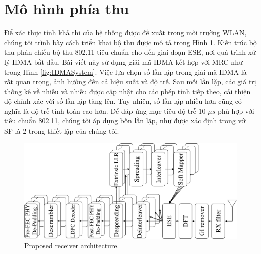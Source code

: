 \section{Mô hình phía thu}

Để xác thực tính khả thi của hệ thống được đề xuất trong môi trường WLAN, chúng tôi trình bày cách triển khai bộ thu được mô tả trong Hình \ref{fig:OFDMA-IDMARx}. Kiến trúc bộ thu phản chiếu bộ thu 802.11 tiêu chuẩn cho đến giai đoạn ESE, nơi quá trình xử lý IDMA bắt đầu. Bài viết này sử dụng giải mã IDMA kết hợp với MRC như trong Hình \ref{fig:IDMASystem}. Việc lựa chọn số lần lặp trong giải mã IDMA là rất quan trọng, ảnh hưởng đến cả hiệu suất và độ trễ. Sau mỗi lần lặp, các giá trị thống kê về nhiễu và nhiễu được cập nhật cho các phép tính tiếp theo, cải thiện độ chính xác với số lần lặp tăng lên. Tuy nhiên, số lần lặp nhiều hơn cũng có nghĩa là độ trễ tính toán cao hơn. Để đáp ứng mục tiêu độ trễ 10 $\mu s$ phù hợp với tiêu chuẩn 802.11, chúng tôi áp dụng bốn lần lặp, như được xác định trong \cite{UL-OFDM-IDMA} với SF là 2 trong thiết lập của chúng tôi.

\begin{figure}[H]
    \centering
        \includegraphics[width=0.75\linewidth]{figure/chap3/Proposed_Receiver.pdf}
    \caption{Proposed receiver architecture.}
    \label{fig:OFDMA-IDMARx}
\end{figure}